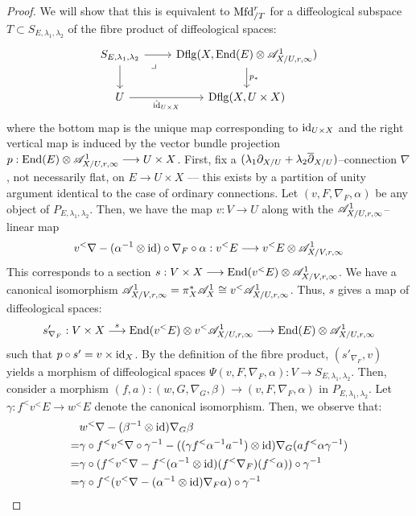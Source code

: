 \documentclass[11pt]{amsart}
\begin{document}
\begin{proof}
We will show that this is equivalent to
$\mathrm{Mfd}^r_{/T}$ for a diffeological subspace $T \subset S_{E, \lambda_1, \lambda_2}$ of the fibre
product of diffeological spaces:
\[\begin{tikzcd}
S_{E, \lambda_1, \lambda_2} \ar[r] \ar[d] \ar[rd, phantom, "\lrcorner" very near start] &
\Dflg(X, \End(E) \otimes \sA^1_{X/U, r, \infty}) \ar[d, "p_*"] \\
U \ar[r, "\hat{\id}_{U \times X}" below] & \Dflg(X, U \times X)
\end{tikzcd}\]
where the bottom map is the unique map corresponding to $\mathrm{id}_{U \times X}$ and the right vertical
map is induced by the vector bundle projection
$p : \End(E) \otimes \sA_{X/U, r, \infty}^1 \to U \times X$.
First, fix a $(\lambda_1\partial_{X/U} + \lambda_2\overline{\partial}_{X/U})$--connection $\nabla$, not necessarily
flat, on $E \to U \times X$ --- this exists by a partition of unity argument identical to the case
of ordinary connections.
Let $(v, F, \nabla_F, \alpha)$ be any object of $P_{E, \lambda_1, \lambda_2}$.
Then, we have the map $v : V \to U$ along with the $\mathscr{A}_{X/U, r, \infty}^1$--linear map
\[
v^<\nabla - (\alpha^{-1} \otimes \id) \circ \nabla_F \circ \alpha :
v^<E \to v^<E \otimes \sA_{X/V, r, \infty}^1
\]
This corresponds to a section $s : V \times X \to \End(v^<E) \otimes \sA_{X/V, r, \infty}^1$.
We have a canonical isomorphism
$\mathscr{A}_{X/V, r, \infty}^1 = \pi_X^*\mathscr{A}^1_X \cong v^<\mathscr{A}_{X/U, r, \infty}^1$.
Thus, $s$ gives a map of diffeological spaces:
\[
s'_{\nabla_F} : V \times X \to[s] \End(v^<E) \otimes v^<\sA_{X/U, r, \infty}^1
\to \End(E) \otimes \sA_{X/U, r, \infty}^1
\]
such that $p \circ s' = v \times \mathrm{id}_X$. By the definition of the fibre product,
$(s'_{\nabla_F}, v)$ yields a morphism of diffeological spaces
$\Psi(v, F, \nabla_F, \alpha) : V \to S_{E, \lambda_1, \lambda_2}$.
Then, consider a morphism $(f, a) : (w, G ,\nabla_G, \beta) \to (v, F, \nabla_F, \alpha)$
in $P_{E, \lambda_1, \lambda_2}$. Let $\gamma : f^<v^<E \to w^<E$ denote the canonical isomorphism.
Then, we observe that:
\begin{align*}
 & w^<\nabla - (\beta^{-1} \otimes \id)\nabla_G\beta \\
=& \gamma \circ f^<v^<\nabla \circ \gamma^{-1}
   - ((\gamma f^<\alpha^{-1} a^{-1}) \otimes \id) \nabla_G (a f^<\alpha \gamma^{-1}) \\
=& \gamma \circ (f^<v^<\nabla
   - f^<(\alpha^{-1} \otimes \id) (f^<\nabla_F) (f^<\alpha)) \circ \gamma^{-1} \\
=& \gamma \circ f^<(v^<\nabla
   - (\alpha^{-1} \otimes \id) \nabla_F \alpha) \circ \gamma^{-1}

\end{align*}
\end{proof}
\end{document}
